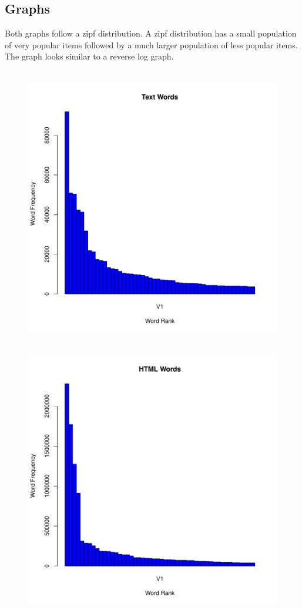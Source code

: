 \documentclass[12pt]{article}
\begin{document}
\subsection{Graphs}
Both graphs follow a zipf distribution.  A zipf distribution has a small population of very popular items followed by a much larger population of less popular items.  The graph looks similar to a reverse log graph.

\begin{figure}[H]
    \centering
    \includegraphics[scale=0.7]{text.pdf}
\end{figure}

\begin{figure}[H]
    \centering
    \includegraphics[scale=0.7]{html.pdf}
\end{figure}

\printbibliography
\end{document}
